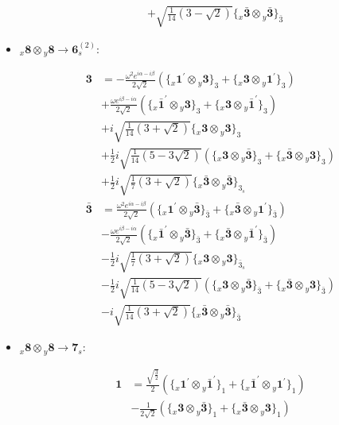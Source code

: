 \documentclass[english]{article}
\newcommand{\rep}[1]{\mathbf{#1}}
\newcommand{\repx}[2]{{}_{#2}\mathbf{#1}}
\newcommand{\tsprodx}[2]{\repx{#1}{x}\otimes\repx{#2}{y}}
\newcommand{\subcgt}[3]{\big\{ \tsprodx{#1}{#2}\big\}^{}_{#3}}
\begin{document}
\begin{itemize}
\begin{fleqn}
\begin{align*}
 & +\sqrt{\frac{1}{14} \left(3-\sqrt{2}\right)}\subcgt{\bar{3}}{\bar{3}}{\bar{3}}
\end{align*}
\end{fleqn}
\item $\tsprodx{8}{8}\to\rep{6}_{s}^{(2)}$:
\begin{fleqn}
\begin{align*}
\rep{3} & = -\frac{\omega ^2 e^{i \alpha -i \beta }}{2 \sqrt{2}}\left(\subcgt{1^{\prime}}{3}{3}+\subcgt{3}{1^{\prime}}{3}\right) \\ 
 & +\frac{\omega  e^{i \beta -i \alpha }}{2 \sqrt{2}}\left(\subcgt{\bar{1}^{\prime}}{3}{3}+\subcgt{3}{\bar{1}^{\prime}}{3}\right) \\ 
 & +i \sqrt{\frac{1}{14} \left(3+\sqrt{2}\right)}\subcgt{3}{3}{3} \\ 
 & +\frac{1}{2} i \sqrt{\frac{1}{14} \left(5-3 \sqrt{2}\right)}\left(\subcgt{3}{\bar{3}}{3}+\subcgt{\bar{3}}{3}{3}\right) \\ 
 & +\frac{1}{2} i \sqrt{\frac{1}{7} \left(3+\sqrt{2}\right)}\subcgt{\bar{3}}{\bar{3}}{3_{s}}
\end{align*}
\begin{align*}
\rep{\bar{3}} & = \frac{\omega ^2 e^{i \alpha -i \beta }}{2 \sqrt{2}}\left(\subcgt{1^{\prime}}{\bar{3}}{\bar{3}}+\subcgt{\bar{3}}{1^{\prime}}{\bar{3}}\right) \\ 
 & -\frac{\omega  e^{i \beta -i \alpha }}{2 \sqrt{2}}\left(\subcgt{\bar{1}^{\prime}}{\bar{3}}{\bar{3}}+\subcgt{\bar{3}}{\bar{1}^{\prime}}{\bar{3}}\right) \\ 
 & -\frac{1}{2} i \sqrt{\frac{1}{7} \left(3+\sqrt{2}\right)}\subcgt{3}{3}{\bar{3}_{s}} \\ 
 & -\frac{1}{2} i \sqrt{\frac{1}{14} \left(5-3 \sqrt{2}\right)}\left(\subcgt{3}{\bar{3}}{\bar{3}}+\subcgt{\bar{3}}{3}{\bar{3}}\right) \\ 
 & -i \sqrt{\frac{1}{14} \left(3+\sqrt{2}\right)}\subcgt{\bar{3}}{\bar{3}}{\bar{3}}
\end{align*}
\end{fleqn}
\item $\tsprodx{8}{8}\to\rep{7}_{s}$:
\begin{fleqn}
\begin{align*}
\rep{1} & = \frac{\sqrt{\frac{3}{2}}}{2}\left(\subcgt{1^{\prime}}{\bar{1}^{\prime}}{1}+\subcgt{\bar{1}^{\prime}}{1^{\prime}}{1}\right) \\ 
 & -\frac{1}{2 \sqrt{2}}\left(\subcgt{3}{\bar{3}}{1}+\subcgt{\bar{3}}{3}{1}\right)
\end{align*}

\end{fleqn}
\end{itemize}
\end{document}
